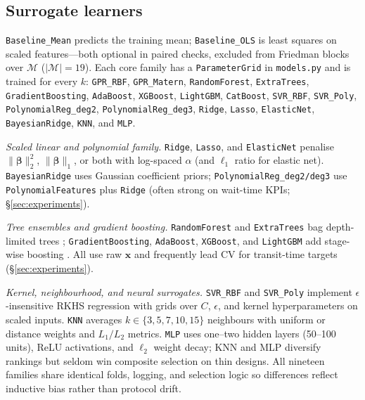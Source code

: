 \documentclass[10pt,twocolumn]{article}
\begin{document}
\subsection{Surrogate learners}
\label{sec:method-learners}

\texttt{Baseline\_Mean} predicts the training mean; \texttt{Baseline\_OLS} is least squares on scaled features---both optional in paired checks, excluded from Friedman blocks over $\mathcal{M}$ ($|\mathcal{M}|{=}19$).
Each core family has a \texttt{ParameterGrid} in \texttt{models.py} and is trained for every $k$:
\texttt{GPR\_RBF}, \texttt{GPR\_Matern}, \texttt{RandomForest}, \texttt{ExtraTrees}, \texttt{GradientBoosting}, \texttt{AdaBoost}, \texttt{XGBoost}, \texttt{LightGBM}, \texttt{CatBoost}, \texttt{SVR\_RBF}, \texttt{SVR\_Poly}, \texttt{PolynomialReg\_deg2}, \texttt{PolynomialReg\_deg3}, \texttt{Ridge}, \texttt{Lasso}, \texttt{ElasticNet}, \texttt{BayesianRidge}, \texttt{KNN}, and \texttt{MLP}.

\emph{Scaled linear and polynomial family.}
\texttt{Ridge}, \texttt{Lasso}, and \texttt{ElasticNet} penalise $\|\boldsymbol{\beta}\|_2^2$, $\|\boldsymbol{\beta}\|_1$, or both with log-spaced $\alpha$ (and $\ell_1$ ratio for elastic net).
\texttt{BayesianRidge} uses Gaussian coefficient priors; \texttt{PolynomialReg\_deg2/deg3} use \texttt{PolynomialFeatures} plus \texttt{Ridge} (often strong on wait-time KPIs; \S\ref{sec:experiments}).

\emph{Tree ensembles and gradient boosting.}
\texttt{RandomForest} and \texttt{ExtraTrees} bag depth-limited trees \citep{breiman2001random}; \texttt{GradientBoosting}, \texttt{AdaBoost}, \texttt{XGBoost}, and \texttt{LightGBM} add stage-wise boosting \citep{friedman2001gbm,chen2016xgboost,ke2017lightgbm}.
All use raw $\mathbf{x}$ and frequently lead CV for transit-time targets (\S\ref{sec:experiments}).

\emph{Kernel, neighbourhood, and neural surrogates.}
\texttt{SVR\_RBF} and \texttt{SVR\_Poly} implement $\epsilon$-insensitive RKHS regression with grids over $C$, $\epsilon$, and kernel hyperparameters on scaled inputs.
\texttt{KNN} averages $k \in \{3,5,7,10,15\}$ neighbours with uniform or distance weights and $L_1/L_2$ metrics.
\texttt{MLP} uses one--two hidden layers (50--100 units), ReLU activations, and $\ell_2$ weight decay; KNN and MLP diversify rankings but seldom win composite selection on thin designs.
All nineteen families share identical folds, logging, and selection logic so differences reflect inductive bias rather than protocol drift.
\end{document}
